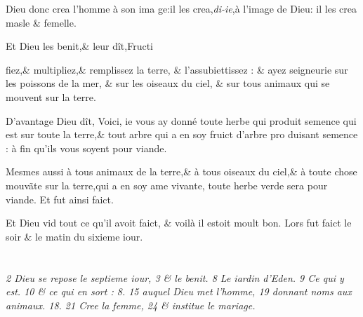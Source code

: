\documentclass[twocolumn,paper=a4,pagesize=pdftex,12pt,headinclude=on]{scrbook}
\newenvironment{chaptercomment}
  {%
    \setlength{\leftskip}{1em}
    \setlength{\rightskip}{1em}
    \begin{spacing}{0.8}
      \itshape\tiny\hspace{-2em}}
  {%
    \end{spacing}
    \setlength{\leftskip}{0pt}
    \setlength{\rightskip}{0pt}
  }
\newcounter{verse}
\newcommand{\bverse}{%
  \addtocounter{verse}{1}
  \theverse\quad
}
\newcommand{\bchapter}[1][chapitre]{%
   \setcounter{verse}{0}%
   \def\chaptertitle{#1}
   \section{}{}
}
\begin{document}
\bverse Dieu donc crea l'homme à son ima \linebreak
ge:\footnotemarkverse{}\footnotemarkmain{}il les
crea,\emph{di-ie},à l'image de Dieu:
\footnotemarkverse{}il les crea masle \& femelle.

\bverse Et Dieu les benit,\& leur dît,\footnotemarkmain{}Fructi\linebreak


fiez,\& multipliez,\& remplissez la terre,
\& l'assubiettissez : \& \footnotemarkmain{}ayez seigneurie
sur les poissons de la mer, \& sur les oi\-seaux
du ciel, \& sur tous animaux qui se mouvent sur la terre.

\bverse D'avantage Dieu dît, Voici, ie vous
ay donné toute herbe qui produit se\-mence
qui est sur toute la terre,\& tout
arbre qui a en soy fruict d'arbre pro\-
duisant semence : \footnotemarkverse{}à fin qu'ils vous
soyent pour viande.

\bverse Mesmes aussi à tous animaux de la
terre,\& à tous oiseaux du ciel,\& à tou\-te
chose mouv\~ate sur la terre,qui a en
soy ame vivante, toute herbe verde se\-ra
pour viande. Et fut ainsi faict.

\bverse \footnotemarkmain{} \footnotemarkverse{}Et Dieu vid
tout ce qu'il avoit faict, \& voilà il estoit moult bon. Lors
fut faict le soir \& le matin du sixieme
iour.


\bchapter[chap.]

\begin{chaptercomment}
 \emph{2} Dieu se repose le septieme iour,
 \emph{3} \& le benit.
 \emph{8} Le iardin d'Eden. \linebreak
 \emph{9} Ce qui y est.
 \emph{10} \& ce qui en sort :
 \emph{8. 15} auquel Dieu \linebreak
 met l'homme,
 \emph{19} donnant noms aux animaux.
 \emph{18. 21} Cree la \linebreak
 femme,
 \emph{24} \& institue le mariage.
\end{chaptercomment}

\vspace{\baselineskip}
\end{document}

